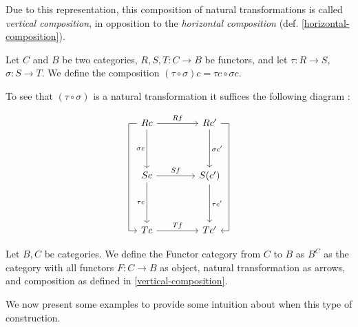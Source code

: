 Due to this representation, this composition of natural transformations is called \emph{vertical composition}, in opposition to the \emph{horizontal composition} (def. \ref{horizontal-composition}).

\begin{definition}\label{vertical-composition}
  Let $C$ and $B$ be two categories, $R,S,T : C \to B$ be functors, and let $\tau: R \to S$, $\sigma:S\to T$. We define the composition $(\tau \circ \sigma)c = \tau c\circ \sigma c$.
\end{definition}


To see that $(\tau \circ \sigma)$ is a natural transformation it suffices the following diagram \cite{stack-composition-natural}:

\[
\begin{tikzcd}[row sep = 1.4cm, column sep = 1.4cm]
  R c
  \arrow[lddr, to path= { --
    ([xshift=-1ex]\tikztostart.west)
    -| ([xshift=-2ex]\tikztotarget.west)
    |- (\tikztotarget)}]
  \arrow[d, swap, "\sigma c"]
  \arrow[r, "R f"] 
  & R c'
  \arrow[d, "\sigma c'"]
  \arrow[rddl, to path= { --
    ([xshift=1ex]\tikztostart.east) 
    -| ([xshift=2ex]\tikztotarget.east)
    -- (\tikztotarget)}, "\sigma \circ \tau c'"]
  \\
  S c
  \arrow[d, swap, "\tau c "] 
  \arrow[r, "S f "] & S(c')
  \arrow[d, "\tau c'"] \\
  T c 
  \arrow[r, "T f"] & T c'
\end{tikzcd}
\]



\begin{definition}
  Let $B,C$ be categories. We define the Functor category from $C$ to $B$ as $B^C$ as  the category with all functors $F:C \to B$ as object, natural transformation as arrows, and composition as defined in \ref{vertical-composition}.
\end{definition}


We now present some examples to provide some intuition about when this type of construction.

